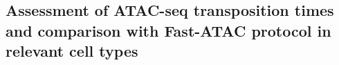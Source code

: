 %



\subsection{Assessment of ATAC-seq transposition times and comparison with Fast-ATAC protocol in relevant cell types}

